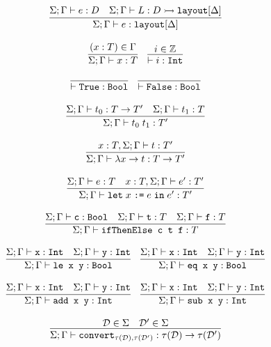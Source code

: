 \documentclass[10pt]{article}
\begin{document}
\[
  \begin{array}{c}
    \infer{\Sigma ; \Gamma \vdash e : \ttt{layout}[\Delta]}{\Sigma ; \Gamma \vdash e : D & \Sigma ; \Gamma \vdash L : D \hra \ttt{layout}[\Delta]}
    \\\\
    \infer{\Sigma ; \Gamma \vdash x : T}{(x : T) \in \Gamma}
    ~~~
    \infer{\vdash i : \ttt{Int}}{i \in \mathbb{Z}}
    \\\\
    \infer{\vdash \ttt{True} : \ttt{Bool}}{}
    ~~~
    \infer{\vdash \ttt{False} : \ttt{Bool}}{}
    \\\\
    \infer{\Sigma ; \Gamma \vdash t_0\; t_1 : T'}{\Sigma ; \Gamma \vdash t_0 : T \ra T' & \Sigma ; \Gamma \vdash t_1 : T}
    \\\\
    \infer{\Sigma ; \Gamma \vdash \lambda x \ra t : T \ra T'}{x : T, \Sigma ; \Gamma \vdash t : T'}
    \\\\
    \infer{\Sigma ; \Gamma \vdash \letbnd\; x\; \ttt{:=}\; e\; \inexpr\; e' : T'}{\Sigma ; \Gamma \vdash e : T & x : T, \Sigma ; \Gamma \vdash e' : T'}
    \\\\
    \infer{\Sigma ; \Gamma \vdash \ttt{ifThenElse c t f} : T}{\Sigma ; \Gamma \vdash \ttt{c} : \Bool & \Sigma ; \Gamma \vdash \ttt{t} : T & \Sigma ; \Gamma \vdash \ttt{f} : T}
    \\\\
    \infer{\Sigma ; \Gamma \vdash \ttt{le x y} : \Bool}{\Sigma ; \Gamma \vdash \ttt{x} : \Int & \Sigma ; \Gamma \vdash \ttt{y} : \Int}
    ~~~
    \infer{\Sigma ; \Gamma \vdash \ttt{eq x y} : \Bool}{\Sigma ; \Gamma \vdash \ttt{x} : \Int & \Sigma ; \Gamma \vdash \ttt{y} : \Int}
    \\\\
    \infer{\Sigma ; \Gamma \vdash \ttt{add x y} : \Int}{\Sigma ; \Gamma \vdash \ttt{x} : \Int & \Sigma ; \Gamma \vdash \ttt{y} : \Int}
    ~~~
    \infer{\Sigma ; \Gamma \vdash \ttt{sub x y} : \Int}{\Sigma ; \Gamma \vdash \ttt{x} : \Int & \Sigma ; \Gamma \vdash \ttt{y} : \Int}
    \\\\
    \infer{\Sigma ; \Gamma \vdash \ttt{convert}_{\tau(\mathcal{D}),\tau({\mathcal{D}'})} : \tau(\mathcal{D}) \ra \tau(\mathcal{D}')}{\mathcal{D} \in \Sigma & \mathcal{D}' \in \Sigma}
    \\\\

\end{array}\]
\end{document}
